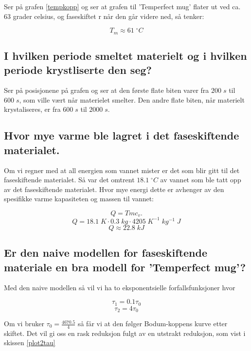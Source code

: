 \documentclass[ reprint, amsmath,amssymb, aps]{revtex4-2}
\begin{document}
Ser på grafen \ref{tempkopp} og ser at grafen til 'Temperfect mug' flater ut ved ca. 63 grader celsius, og faseskiftet r når den går videre ned, så tenker:

$$T_m \approx 61 \; ^{\circ}C$$

\subsection*{I hvilken periode smeltet materielt og i hvilken periode krystliserte den seg?}

Ser på posisjonene på grafen og ser at den første flate biten varer fra $200 \; s$ til $600 \;s$, som ville vært når materielet smelter. Den andre flate biten, når materielt krystaliseres, er fra $600 \; s$ til $2000 \; s$. 

\subsection*{Hvor mye varme ble lagret i det faseskiftende materialet.}

Om vi regner med at all energien som vannet mister er det som blir gitt til det faseskiftende materialet. Så var det omtrent $18.1 \; ^{\circ}C$ av vannet som ble tatt opp av det faseskiftende materialet. Hvor mye energi dette er avhenger av den spesifikke varme kapasiteten og massen til vannet:

$$Q = T m c_v.$$
$$Q = 18.1 \; K \cdot 0.3 \; kg \cdot 4205 \; K^{-1}\; kg^{-1} \; J $$
$$Q \approx 22.8 \; kJ$$

\subsection*{Er den naive modellen for faseskiftende materiale en bra modell for 'Temperfect mug'?}

Med den naive modellen så vil vi ha to eksponentsielle forfallsfunksjoner hvor

$$\tau_1 = 0.1 \tau_0$$
$$\tau_2 = 4 \tau_0$$

Om vi bruker $ \tau_0 = \frac{4670.5}{4}$ så får vi at den følger Bodum-koppens kurve etter skiftet. Det vil gi oss en rask reduksjon fulgt av en utstrakt reduksjon, som vist i skissen \ref{plot2tau}
\end{document}
